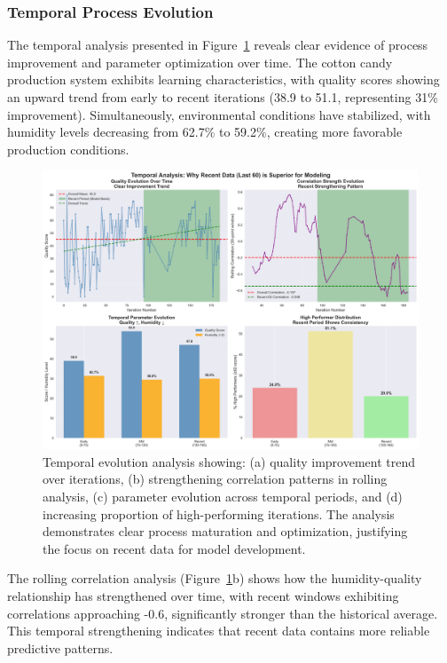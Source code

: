\subsubsection{Temporal Process Evolution}

The temporal analysis presented in Figure~\ref{fig:temporal-evolution} reveals clear evidence of process improvement and parameter optimization over time. The cotton candy production system exhibits learning characteristics, with quality scores showing an upward trend from early to recent iterations (38.9 to 51.1, representing 31\% improvement). Simultaneously, environmental conditions have stabilized, with humidity levels decreasing from 62.7\% to 59.2\%, creating more favorable production conditions.

\begin{figure}[htbp]
    \centering
    \includegraphics[width=\textwidth]{graphs/temporal_superiority_analysis.png}
    \caption{Temporal evolution analysis showing: (a) quality improvement trend over iterations, (b) strengthening correlation patterns in rolling analysis, (c) parameter evolution across temporal periods, and (d) increasing proportion of high-performing iterations. The analysis demonstrates clear process maturation and optimization, justifying the focus on recent data for model development.}
    \label{fig:temporal-evolution}
\end{figure}

The rolling correlation analysis (Figure~\ref{fig:temporal-evolution}b) shows how the humidity-quality relationship has strengthened over time, with recent windows exhibiting correlations approaching -0.6, significantly stronger than the historical average. This temporal strengthening indicates that recent data contains more reliable predictive patterns.

